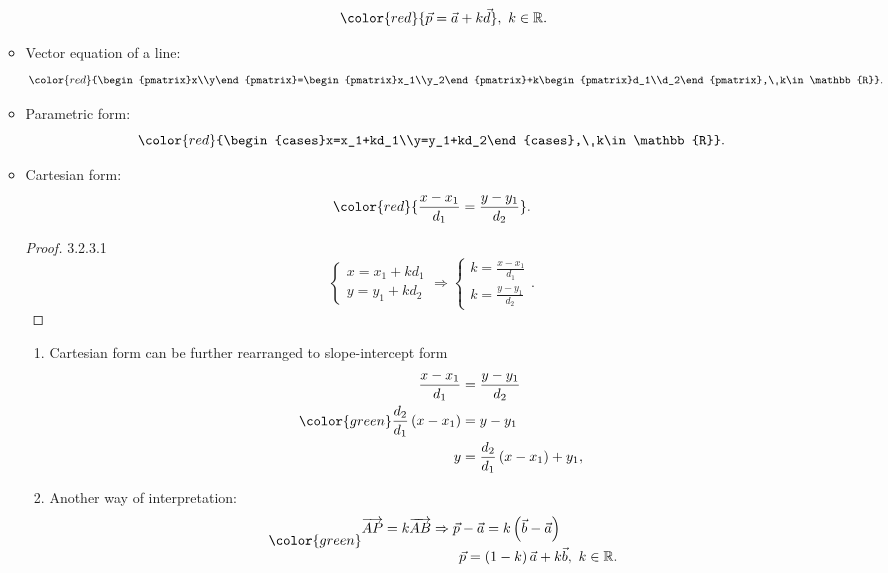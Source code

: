 \documentclass[12pt, a4paper]{article}
\def\d{{\mathrm{d}}}
\begin{document}
\begin{enumerate}
\begin{itemize}
\begin{enumerate}
      $${\color{red}{\vec{p}=\vec{a}+k\vec{d}}},\ k\in\mathbb{R}.$$
    \end{enumerate}
    \item Vector equation of a line: 
    $${\color{red}{\begin{pmatrix}x\\y\end{pmatrix}=\begin{pmatrix}x_1\\y_2\end{pmatrix}+k\begin{pmatrix}d_1\\d_2\end{pmatrix},\ k\in\mathbb{R}}}.$$
    \item Parametric form: 
    $${\color{red}{\begin{cases}x=x_1+kd_1\\y=y_1+kd_2\end{cases},\ k\in\mathbb{R}}}.$$
    \item Cartesian form: 
    $${\color{red}{\frac{x-x_1}{d_1}=\frac{y-y_1}{d_2}}}.$$
    \begin{proof}{3.2.3.1}{}
      $$\begin{cases}x=x_1+kd_1\\y=y_1+kd_2\end{cases}\Rightarrow\begin{cases}k=\frac{x-x_1}{d_1}\\k=\frac{y-y_1}{d_2}\end{cases}.$$
    \end{proof}
    \begin{enumerate}
      \item Cartesian form can be further rearranged to slope-intercept form
      $$\color{green}
      \begin{aligned}
        \frac{x-x_1}{d_1}&=\frac{y-y_1}{d_2}\\
        \frac{d_2}{d_1}\left(x-x_1\right)&=y-y_1\\
        y&=\frac{d_2}{d_1}\left(x-x_1\right)+y_1,\ 
      \end{aligned}$$
      {}
      \item Another way of interpretation: 
      $$\color{green}
      \begin{aligned}
        \overrightarrow{AP}=k\overrightarrow{AB}&\Rightarrow\vec{p}-\vec{a}=k\left(\vec{b}-\vec{a}\right)\\
        &\ \ \ \ \ \ \vec{p}=\left(1-k\right)\vec{a}+k\vec{b},\ k\in\mathbb{R}.\\

\end{aligned}$$
\end{enumerate}
\end{itemize}
\end{enumerate}
\end{document}

